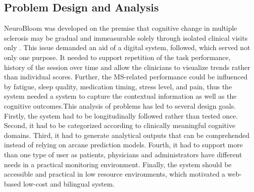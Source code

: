 \documentclass[12pt,a4paper]{report}
\begin{document}
\subsection{Problem Design and Analysis}
NeuroBloom was developed on the premise that cognitive change in multiple sclerosis may be gradual and immeasurable solely through isolated clinical visits only \cite{chiaravalloti2008,amato2006,rocca2015}. This issue demanded an aid of a digital system, followed, which served not only one purpose. It needed to support repetition of the task performance, history of the session over time and allow the clinicians to visualize trends rather than individual scores. Further, the MS-related performance could be influenced by fatigue, sleep quality, medication timing, stress level, and pain, thus the system needed a system to capture the contextual information as well as the cognitive outcomes.This analysis of problems has led to several design goals. Firstly, the system had to be longitudinally followed rather than tested once. Second, it had to be categorized according to clinically meaningful cognitive domains. Third, it had to generate analytical outputs that can be comprehended instead of relying on arcane prediction models. Fourth, it had to support more than one type of user as patients, physicians and administrators have different needs in a practical monitoring environment. Finally, the system should be accessible and practical in low resource environments, which motivated a web-based low-cost and bilingual system.
\end{document}

